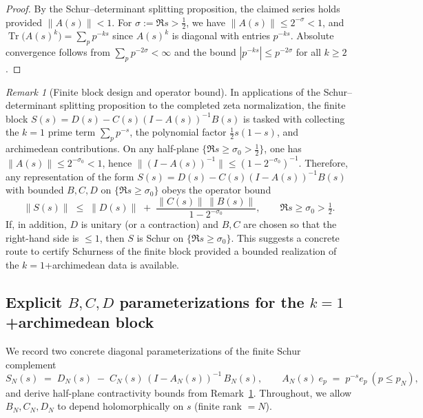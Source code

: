 \documentclass[11pt]{article}
\theoremstyle{definition}
\theoremstyle{remark}
\newtheorem{remark}[theorem]{Remark}
\DeclareMathOperator{\Tr}{Tr}
\begin{document}
\begin{proof}
By the Schur--determinant splitting proposition, the claimed series holds provided \(\|A(s)\|<1\). For \(\sigma:=\Re s>\tfrac12\), we have \(\|A(s)\|\le 2^{-\sigma}<1\), and \(\Tr\big(A(s)^k\big)=\sum_p p^{-ks}\) since \(A(s)^k\) is diagonal with entries \(p^{-ks}\). Absolute convergence follows from \(\sum_p p^{-2\sigma}<\infty\) and the bound \(|p^{-ks}|\le p^{-2\sigma}\) for all \(k\ge 2\).
\end{proof}
\begin{remark}[Finite block design and operator bound]\label{rem:finite-block-design}
In applications of the Schur--determinant splitting proposition to the completed zeta normalization, the finite block \(S(s)=D(s)-C(s)(I-A(s))^{-1}B(s)\) is tasked with collecting the \(k=1\) prime term \(\sum_p p^{-s}\), the polynomial factor \(\tfrac12 s(1-s)\), and archimedean contributions. On any half-plane \(\{\Re s\ge \sigma_0>\tfrac12\}\), one has \(\|A(s)\|\le 2^{-\sigma_0}<1\), hence \(\|(I-A(s))^{-1}\|\le (1-2^{-\sigma_0})^{-1}\). Therefore, any representation of the form \(S(s)=D(s)-C(s)(I-A(s))^{-1}B(s)\) with bounded \(B,C,D\) on \(\{\Re s\ge \sigma_0\}\) obeys the operator bound
\[
 \|S(s)\|\;\le\;\|D(s)\|\; +\; \frac{\|C(s)\|\,\|B(s)\|}{1-2^{-\sigma_0}},\qquad \Re s\ge \sigma_0>\tfrac12.
\]
If, in addition, \(D\) is unitary (or a contraction) and \(B,C\) are chosen so that the right-hand side is \(\le 1\), then \(S\) is Schur on \(\{\Re s\ge \sigma_0\}\). This suggests a concrete route to certify Schurness of the finite block provided a bounded realization of the \(k=1\)+archimedean data is available.
\end{remark}

\subsection{Explicit $B,C,D$ parameterizations for the $k=1$+archimedean block}\label{subsec:BCD-params}
We record two concrete diagonal parameterizations of the finite Schur complement
\[
 S_N(s)\;=\;D_N(s)\; -\; C_N(s)\,(I-A_N(s))^{-1}\,B_N(s),\qquad A_N(s)\ e_p\;=\;p^{-s}e_p\ (p\le p_N),
\]
and derive half-plane contractivity bounds from Remark~\ref{rem:finite-block-design}. Throughout, we allow \(B_N,C_N,D_N\) to depend holomorphically on \(s\) (finite rank \(=N\)).
\end{document}

